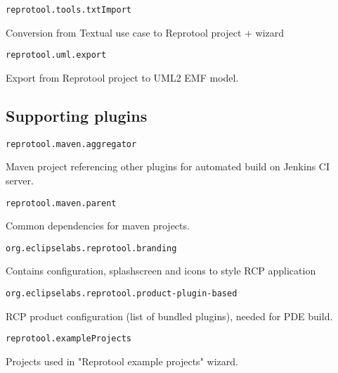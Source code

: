 \begin{verbatim}
reprotool.tools.txtImport
\end{verbatim}
Conversion from Textual use case to Reprotool project + wizard

\begin{verbatim}
reprotool.uml.export
\end{verbatim}
Export from Reprotool project to UML2 EMF model.

\subsection{Supporting plugins}

\begin{verbatim}
reprotool.maven.aggregator
\end{verbatim}
Maven project referencing other plugins for automated build on Jenkins CI server.

\begin{verbatim}
reprotool.maven.parent
\end{verbatim}
Common dependencies for maven projects.

\begin{verbatim}
org.eclipselabs.reprotool.branding
\end{verbatim}
Contains configuration, splashscreen and icons to style RCP application

\begin{verbatim}
org.eclipselabs.reprotool.product-plugin-based
\end{verbatim}
RCP product configuration (list of bundled plugins), needed for PDE build.

\begin{verbatim}
reprotool.exampleProjects
\end{verbatim}
Projects used in "Reprotool example projects" wizard.